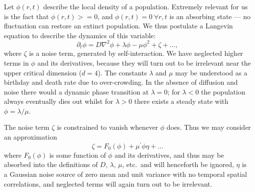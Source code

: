 \documentclass[10pt,english]{report}
\begin{document}
Let $\phi(r,t)$ describe the local density of a population. Extremely relevant for us is the fact that $\phi(r,t) >= 0$, and $\phi(r,t)=0~\forall r,t$ is an absorbing state --- no fluctuation can restore an extinct population. We thus postulate a Langevin equation to describe the dynamics of this variable: 
\begin{equation}
\partial_t \phi = D \nabla^2 \phi + \lambda \phi - \mu \phi^2 + \zeta + \ldots, \label{eq:DP-langevin}
\end{equation}
where $\zeta$ is a noise term, generated by self-interaction. We have neglected higher terms in $\phi$ and its derivatives, because they will turn out to be irrelevant near the upper critical dimension ($d=4$). The constants $\lambda$ and $\mu$ may be understood as a birthday and death rate due to over-crowding. In the absence of diffusion and noise there would a dynamic phase transition at $\lambda=0$; for $\lambda < 0$ the population always eventually dies out whilst for $\lambda > 0$ there exists a steady state with $\phi = \lambda/\mu$.

\newcommand{\tphi}{\ensuremath{\tilde \phi}}
\newcommand{\tJ}{\ensuremath{\tilde J}}

The noise term $\zeta$ is constrained to vanish whenever $\phi$ does. Thus we may consider an approximation $$\zeta = F_0(\phi) + \mu^\prime \phi \eta + \ldots$$ where $F_0(\phi)$ is some function of $\phi$ and its derivatives, and thus may be absorbed into the definitions of $D$, $\lambda$, $\mu$, etc.\ and will henceforth be ignored, $\eta$ is a Gaussian noise source of zero mean and unit variance with no temporal spatial correlations, and neglected terms will again turn out to be irrelevant. 
\end{document}
